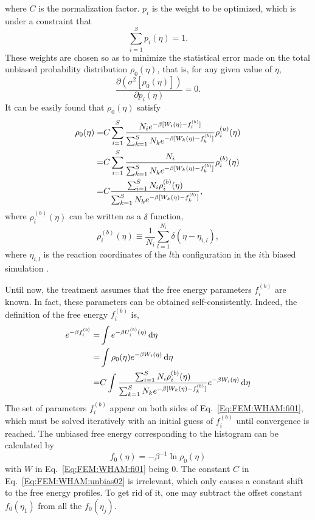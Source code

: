 where $C$ is the normalization factor. $p_i$ is the weight to be optimized, which is under a constraint that
\begin{equation}
\sum_{i=1}^{S}p_{i}(\eta)=1.
\label{Eq:FEM:WHAM:p1}
\end{equation}
These weights are chosen so as to minimize the statistical error made on the total unbiased probability distribution $\rho_{0}(\eta)$, that is, for any given value of $\eta$,
\begin{equation}
\frac{\partial(\sigma^2[\rho_{0}(\eta)])}{\partial p_{i}(\eta)}=0.
\label{Eq:FEM:WHAM:partialp}
\end{equation} 
It can be easily found that $\rho_{0}(\eta)$ satisfy
\begin{align}
\rho_{0}(\eta) = & C\sum_{i=1}^{S}\frac{N_{i}e^{-\beta[W_{i}(\eta)-f_{i}^{(b)}]}}{\sum_{k=1}^{S}N_{k}e^{-\beta[W_{k}(\eta)-f_{k}^{(b)}]}}\rho_{i}^{(u)}(\eta) \notag\\
= & C\sum_{i=1}^{S}\frac{N_{i}}{\sum_{k=1}^{S}N_{k}e^{-\beta[W_{k}(\eta)-f_{k}^{(b)}]}}\rho_{i}^{(b)}(\eta) \notag\\
= & C\frac{\sum_{i=1}^{S}N_{i}\rho_{i}^{(b)}(\eta)}{\sum_{k=1}^{S}N_{k}e^{-\beta[W_{k}(\eta)-f_{k}^{(b)}]}},
\label{Eq:FEM:WHAM:unbias02}
\end{align} 
where $\rho_{i}^{(b)}(\eta)$ can be written as a $\delta$ function,
\begin{equation}
\rho_{i}^{(b)}(\eta) \equiv \frac{1}{N_{i}} \sum_{l=1}^{N_{i}} \delta {(\eta-\eta_{i,l})},
\label{Eq:FEM:WHAM:delta01}
\end{equation} 
where $\eta_{i,l}$ is the reaction coordinates of the $l$th configuration in the $i$th biased simulation .

Until now, the treatment assumes that the free energy parameters ${f_{i}^{(b)}}$ are known. In fact, these parameters can be obtained self-consistently. Indeed, the definition of the free energy $f_{i}^{(b)}$ is,
\begin{align}
e^{-\beta f_{i}^{(b)}}=&\int e^{-\beta U_{i}^{(b)}(\eta) } \mathop{}\!\mathrm{d}\eta \notag\\
=&\int \rho_{0}(\eta) e^{-\beta W_{i}(\eta)} \mathop{}\!\mathrm{d}\eta \notag\\
=&C \int \frac{\sum_{i=1}^{S}N_{i}\rho_{i}^{(b)}(\eta)}{\sum_{k=1}^{S}N_{k}e^{-\beta[W_{k}(\eta)-f_{k}^{(b)}]}}e^{-\beta W_{i}(\eta)}  \mathop{}\!\mathrm{d}\eta
\label{Eq:FEM:WHAM:fi01}
\end{align} 
The set of parameters ${f_{i}^{(b)}}$ appear on both sides of Eq.~\ref{Eq:FEM:WHAM:fi01}, which must be solved iteratively with an initial guess of ${f_{i}^{(b)}}$ until convergence is reached. The unbiased free energy corresponding to the histogram can be calculated by
\begin{equation}
f_{0}(\eta)=-\beta^{-1}\ln \rho_{0}(\eta) 
\label{Eq:FEM:WHAM:f0}
\end{equation}
with $W$ in Eq.~\ref{Eq:FEM:WHAM:fi01} being 0.
The constant $C$ in Eq.~\ref{Eq:FEM:WHAM:unbias02} is irrelevant, which only causes a constant shift to the free energy profiles. To get rid of it, one may subtract the offset constant $f_{0}(\eta_{1})$ from all the $f_{0}(\eta_{j})$.  

